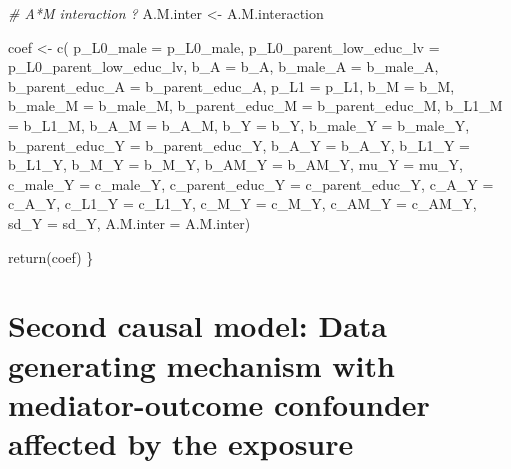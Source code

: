 \documentclass[
]{book}
\newenvironment{Shaded}{\begin{snugshade}}{\end{snugshade}}
\newcommand{\AttributeTok}[1]{\textcolor[rgb]{0.77,0.63,0.00}{#1}}
\newcommand{\CommentTok}[1]{\textcolor[rgb]{0.56,0.35,0.01}{\textit{#1}}}
\newcommand{\FunctionTok}[1]{\textcolor[rgb]{0.00,0.00,0.00}{#1}}
\newcommand{\NormalTok}[1]{#1}
\newcommand{\OtherTok}[1]{\textcolor[rgb]{0.56,0.35,0.01}{#1}}
\begin{document}
\begin{Shaded}
\begin{Highlighting}[]
\CommentTok{\# A*M interaction ?}
\NormalTok{A.M.inter }\OtherTok{\textless{}{-}}\NormalTok{ A.M.interaction}

\NormalTok{coef }\OtherTok{\textless{}{-}} \FunctionTok{c}\NormalTok{( }\AttributeTok{p\_L0\_male =}\NormalTok{ p\_L0\_male, }\AttributeTok{p\_L0\_parent\_low\_educ\_lv =}\NormalTok{ p\_L0\_parent\_low\_educ\_lv, }
           \AttributeTok{b\_A =}\NormalTok{ b\_A, }\AttributeTok{b\_male\_A =}\NormalTok{ b\_male\_A, }\AttributeTok{b\_parent\_educ\_A =}\NormalTok{ b\_parent\_educ\_A, }
           \AttributeTok{p\_L1 =}\NormalTok{ p\_L1,}
           \AttributeTok{b\_M =}\NormalTok{ b\_M, }\AttributeTok{b\_male\_M =}\NormalTok{ b\_male\_M, }\AttributeTok{b\_parent\_educ\_M =}\NormalTok{ b\_parent\_educ\_M, }
            \AttributeTok{b\_L1\_M =}\NormalTok{ b\_L1\_M, }\AttributeTok{b\_A\_M =}\NormalTok{ b\_A\_M,}
           \AttributeTok{b\_Y =}\NormalTok{ b\_Y, }\AttributeTok{b\_male\_Y =}\NormalTok{ b\_male\_Y, }\AttributeTok{b\_parent\_educ\_Y =}\NormalTok{ b\_parent\_educ\_Y, }
            \AttributeTok{b\_A\_Y =}\NormalTok{ b\_A\_Y, }\AttributeTok{b\_L1\_Y =}\NormalTok{ b\_L1\_Y, }\AttributeTok{b\_M\_Y =}\NormalTok{ b\_M\_Y, }\AttributeTok{b\_AM\_Y =}\NormalTok{ b\_AM\_Y,}
           \AttributeTok{mu\_Y =}\NormalTok{ mu\_Y, }\AttributeTok{c\_male\_Y =}\NormalTok{ c\_male\_Y, }\AttributeTok{c\_parent\_educ\_Y =}\NormalTok{ c\_parent\_educ\_Y, }
            \AttributeTok{c\_A\_Y =}\NormalTok{ c\_A\_Y, }\AttributeTok{c\_L1\_Y =}\NormalTok{ c\_L1\_Y, }\AttributeTok{c\_M\_Y =}\NormalTok{ c\_M\_Y, }\AttributeTok{c\_AM\_Y =}\NormalTok{ c\_AM\_Y, }
           \AttributeTok{sd\_Y =}\NormalTok{ sd\_Y, }\AttributeTok{A.M.inter =}\NormalTok{ A.M.inter)}
  
\FunctionTok{return}\NormalTok{(coef)}
\NormalTok{\}}
\end{Highlighting}
\end{Shaded}

\hypertarget{second-causal-model-data-generating-mechanism-with-mediator-outcome-confounder-affected-by-the-exposure}{%
\section{Second causal model: Data generating mechanism with mediator-outcome confounder affected by the exposure}\label{second-causal-model-data-generating-mechanism-with-mediator-outcome-confounder-affected-by-the-exposure}}
\end{document}
